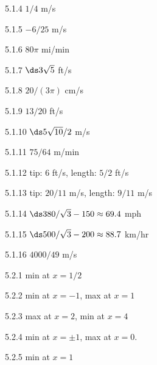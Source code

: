 \begin{Answer}{5.1.4}
	$1/4$ m/s
\end{Answer}
\begin{Answer}{5.1.5}
	$-6/25$ m/s
\end{Answer}
\begin{Answer}{5.1.6}
	$80\pi$ mi/min
\end{Answer}
\begin{Answer}{5.1.7}
	$\ds 3\sqrt5$ ft/s
\end{Answer}
\begin{Answer}{5.1.8}
	$20/(3\pi)$ cm/s
\end{Answer}
\begin{Answer}{5.1.9}
	$13/20$ ft/s
\end{Answer}
\begin{Answer}{5.1.10}
	$\ds 5\sqrt{10}/2$ m/s
\end{Answer}
\begin{Answer}{5.1.11}
	$75/64$ m/min
\end{Answer}
\begin{Answer}{5.1.12}
	tip: 6 ft/s, length: $5/2$ ft/s
\end{Answer}
\begin{Answer}{5.1.13}
	tip: $20/11$ m/s, length: $9/11$ m/s
\end{Answer}
\begin{Answer}{5.1.14}
	$\ds 380/\sqrt3-150\approx 69.4$ mph
\end{Answer}
\begin{Answer}{5.1.15}
	$\ds 500/\sqrt3-200\approx 88.7$ km/hr
\end{Answer}
\begin{Answer}{5.1.16}
	$4000/49$ m/s
\end{Answer}
\begin{Answer}{5.2.1}
		min at $x=1/2$
	
\end{Answer}
\begin{Answer}{5.2.2}
		min at $x=-1$, max at $x=1$
	
\end{Answer}
\begin{Answer}{5.2.3}
		max at $x=2$, min at $x=4$
	
\end{Answer}
\begin{Answer}{5.2.4}
		min at $x=\pm 1$, max at $x=0$.
	
\end{Answer}
\begin{Answer}{5.2.5}
		min at $x=1$
	
\end{Answer}
